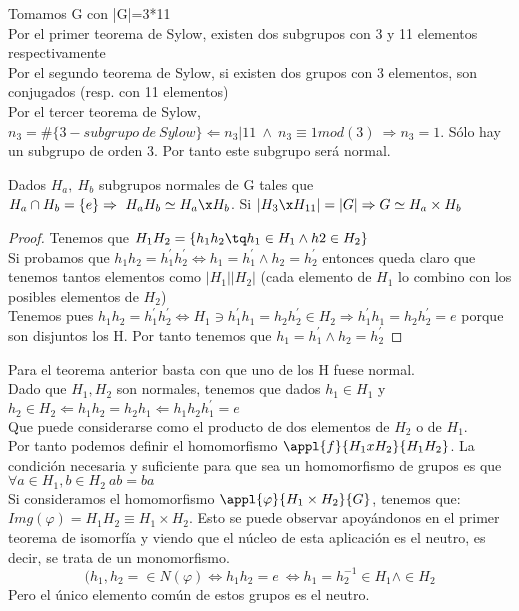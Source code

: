 \documentclass[nochap]{apuntes}
\begin{document}
 \begin{example}
  Tomamos G con |G|=3*11\\
  Por el primer teorema de Sylow, existen dos subgrupos con 3 y 11 elementos respectivamente\\
  Por el segundo teorema de Sylow, si existen dos grupos con 3 elementos, son conjugados (resp. con 11 elementos)\\
  Por el tercer teorema de Sylow, $n_3=\#\{3-subgrupo \ de \ Sylow\} \Leftarrow n_3|11 \ \wedge \ n_3\equiv 1 mod(3) \ \Rightarrow n_3=1$.
  Sólo hay un subgrupo de orden 3. Por tanto este subgrupo será normal.
 \end{example}

 \begin{theorem}
  Dados $H_a, \ H_b$  subgrupos normales de G tales que $H_a\cap H_b = \{e\} \Rightarrow \ H_aH_b \simeq H_a \x H_b$. Si $|H_3\x H_{11}|=|G| \Rightarrow G\simeq H_a\times H_b$
 \end{theorem}
 \begin{proof}
  Tenemos que $H_1H_2=\{h_1h_2\tq h_1\in H_1 \wedge h2\in H_2\}$\\
  Si probamos que $h_1h_2=h_1^{'}h_2^{'} \Leftrightarrow h_1=h_1^{'} \wedge h_2=h_2^{'}$  entonces queda claro que tenemos tantos elementos como
  $|H_1||H_2|$ (cada elemento de $H_1$  lo combino con los posibles elementos de $H_2$)\\
  Tenemos pues $h_1h_2=h_1^{'}h_2^{'} \Leftrightarrow H_1\ni h_1^{'}h_1=h_2h_2^{'} \in H_2 \Rightarrow h_1^{'}h_1=h_2h_2^{'}=e$  porque son 
  disjuntos los H. Por tanto tenemos que $h_1=h_1^{'} \wedge h_2=h_2^{'}$
 \end{proof}

 Para el teorema anterior basta con que uno de los H fuese normal.\\
 Dado que $H_1, H_2$ son normales, tenemos que dados $h_1\in H_1$  y $h_2\in H_2 \Leftarrow h_1h_2=h_2h_1 \Leftarrow h_1h_2h_1^{'}=e$\\
 Que puede considerarse como el producto de dos elementos de $H_2$  o de $H_1$.\\
 Por tanto podemos definir el homomorfismo $\appl{f}{H_1xH_2}{H_1H_2}$. La condición necesaria y suficiente para que sea un homomorfismo
 de grupos es que $\forall a \in H_1, b \in H_2 \ ab=ba$\\
 Si consideramos el homomorfismo $\appl{\varphi}{H_1\times H_2}{G}$, tenemos que:\\
 $Img(\varphi)=H_1H_2\equiv H_1 \times H_2$. Esto se puede observar apoyándonos en el primer teorema de isomorfía y viendo que el 
 núcleo de esta aplicación es el neutro, es decir, se trata de un monomorfismo.\\
 \[(h_1,h_2=\in N(\varphi) \Leftrightarrow h_1h_2=e \ \Leftrightarrow h_1=h_2^{-1}\in H_1 \wedge \in H_2\]
 Pero el único elemento común de estos grupos es el neutro.\\
 
\end{document}
